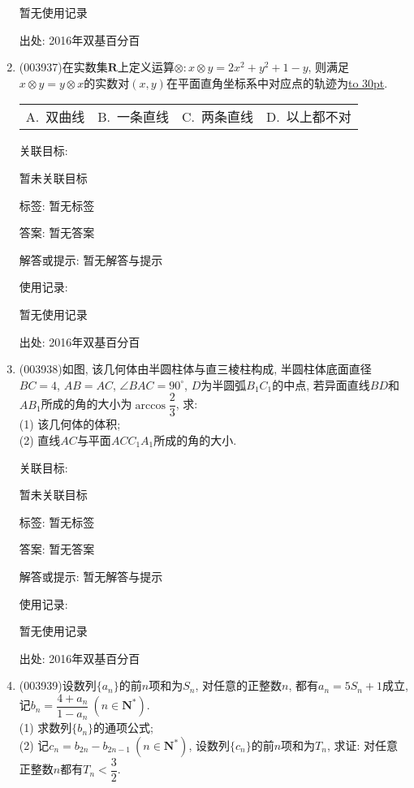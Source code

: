 \documentclass[10pt,a4paper]{article}
\newcommand{\blank}[1]{\underline{\hbox to #1pt{}}}
\newcommand{\fourch}[4]{\par\begin{tabular}{p{.23\textwidth}p{.23\textwidth}p{.23\textwidth}p{.23\textwidth}}
A.~#1 &B.~#2& C.~#3& D.~#4
\end{tabular}}
\begin{document}
\begin{enumerate}[1.]
暂无使用记录


出处: 2016年双基百分百
\item { (003937)}在实数集$\mathbf{R}$上定义运算$\otimes: x\otimes y=2x^2+y^2+1-y$, 则满足$x\otimes y=y\otimes x$的实数对$(x,y)$在平面直角坐标系中对应点的轨迹为\blank{30}.
\fourch{双曲线}{一条直线}{两条直线}{以上都不对}


关联目标:

暂未关联目标



标签: 暂无标签

答案: 暂无答案

解答或提示: 暂无解答与提示

使用记录:

暂无使用记录


出处: 2016年双基百分百
\item { (003938)}如图, 该几何体由半圆柱体与直三棱柱构成, 半圆柱体底面直径$BC=4$, $AB=AC$, $\angle BAC=90^\circ$, $D$为半圆弧$B_1C_1$的中点, 若异面直线$BD$和$AB_1$所成的角的大小为$\arccos\dfrac 23$, 求:\\
(1) 该几何体的体积;\\
(2) 直线$AC$与平面$ACC_1A_1$所成的角的大小.
\begin{center}
\end{center}


关联目标:

暂未关联目标



标签: 暂无标签

答案: 暂无答案

解答或提示: 暂无解答与提示

使用记录:

暂无使用记录


出处: 2016年双基百分百
\item { (003939)}设数列$\{a_n\}$的前$n$项和为$S_n$, 对任意的正整数$n$, 都有$a_n=5S_n+1$成立, 记$b_n=\dfrac{4+a_n}{1-a_n} \ (n\in\mathbf{N}^*)$.\\
(1) 求数列$\{b_n\}$的通项公式;\\
(2) 记$c_n=b_{2n}-b_{2n-1} \ (n\in \mathbf{N}^*)$, 设数列$\{c_n\}$的前$n$项和为$T_n$, 求证: 对任意正整数$n$都有$T_n<\dfrac 32$.



\end{enumerate}
\end{document}
